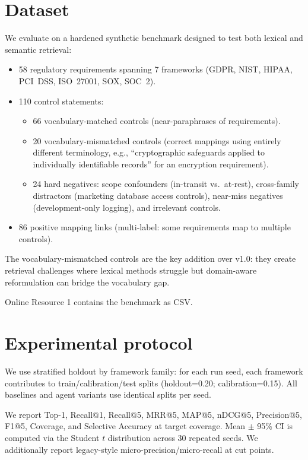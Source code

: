 \documentclass{sn-jnl}
\begin{document}
\section{Dataset}
We evaluate on a hardened synthetic benchmark designed to test both lexical and semantic retrieval:
\begin{itemize}
\item 58 regulatory requirements spanning 7 frameworks (GDPR, NIST, HIPAA, PCI~DSS, ISO~27001, SOX, SOC~2).
\item 110 control statements:
  \begin{itemize}
  \item 66 vocabulary-matched controls (near-paraphrases of requirements).
  \item 20 vocabulary-mismatched controls (correct mappings using entirely different terminology, e.g., ``cryptographic safeguards applied to individually identifiable records'' for an encryption requirement).
  \item 24 hard negatives: scope confounders (in-transit vs.\ at-rest), cross-family distractors (marketing database access controls), near-miss negatives (development-only logging), and irrelevant controls.
  \end{itemize}
\item 86 positive mapping links (multi-label: some requirements map to multiple controls).
\end{itemize}

The vocabulary-mismatched controls are the key addition over v1.0: they create retrieval challenges where lexical methods struggle but domain-aware reformulation can bridge the vocabulary gap.

Online Resource 1 contains the benchmark as CSV.

\section{Experimental protocol}
We use stratified holdout by framework family: for each run seed, each framework contributes to train/calibration/test splits (holdout=0.20; calibration=0.15).
All baselines and agent variants use identical splits per seed.

We report Top-1, Recall@1, Recall@5, MRR@5, MAP@5, nDCG@5, Precision@5, F1@5, Coverage, and Selective Accuracy at target coverage.
Mean $\pm$ 95\% CI is computed via the Student $t$ distribution across 30 repeated seeds.
We additionally report legacy-style micro-precision/micro-recall at cut points.
\end{document}
